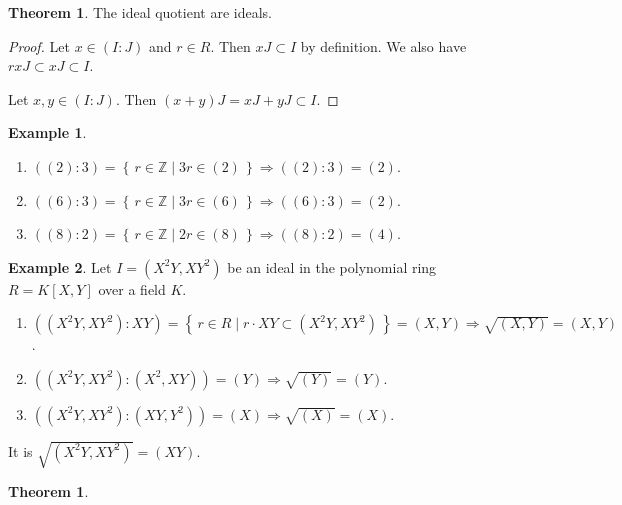 \documentclass[a4paper]{book}
\theoremstyle{definition}
\newtheorem{example}{Example}[definition]
\newtheorem{theorem}[definition]{Theorem}
\newcommand{\makeset}[2]{\left\{\, #1 \mid #2 \,\right\}}
\begin{document}
\begin{thmbox}
  \begin{theorem}
    The ideal quotient are ideals.
  \end{theorem}
\end{thmbox}
\begin{proof}
  Let \(x \in (I : J)\) and \(r \in R\). Then \(xJ \subset I\) by definition. We also have \(rxJ \subset xJ \subset I\).

  Let \(x, y \in (I : J)\). Then \((x + y)J = xJ + yJ \subset I\).
\end{proof}


\begin{example}
  \begin{enumerate}
    \item \(((2) : 3) = \makeset{r \in \mathbb{Z}}{3r \in (2)} \Rightarrow ((2) : 3) = (2)\).
    \item \(((6) : 3) = \makeset{r \in \mathbb{Z}}{3r \in (6)} \Rightarrow ((6) : 3) = (2)\).
    \item \(((8) : 2) = \makeset{r \in \mathbb{Z}}{2r \in (8)} \Rightarrow ((8) : 2) = (4)\).
  \end{enumerate}
\end{example}


\begin{example}
  Let \(I = (X^2Y, XY^2)\) be an ideal in the polynomial ring \(R = K[X, Y]\) over a field \(K\).
  \begin{enumerate}
    \item \(((X^2Y, XY^2) : XY) = \makeset{r \in R}{r \cdot XY \subset (X^2Y, XY^2)} = (X, Y) \Rightarrow \sqrt{(X, Y)} = (X, Y)\).
    \item \(((X^2Y, XY^2) : (X^2, XY)) = (Y) \Rightarrow \sqrt{(Y)} = (Y)\).
    \item \(((X^2Y, XY^2) : (XY, Y^2)) = (X) \Rightarrow \sqrt{(X)} = (X)\).
  \end{enumerate}
  It is \(\sqrt{(X^2Y, XY^2)} = (XY)\).


\end{example}

\begin{theorem}
  
\end{theorem}
\end{document}
